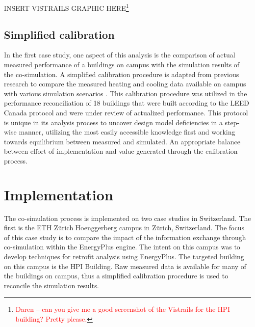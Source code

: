 \documentclass{tBPS2e}
\theoremstyle{plain}
\theoremstyle{definition}
\theoremstyle{remark}
\newcommand{\noteCM}[1]{\footnote{\textcolor{red}{#1}}}
\begin{document}
INSERT VISTRAILS GRAPHIC HERE\noteCM{Daren -- can you give me a good screenshot of the Vistrails for the HPI building? Pretty please.}


\subsection{Simplified calibration}
In the first case study, one aspect of this analysis is the comparison of actual measured performance of a buildings on campus with the simulation results of the co-simulation. A simplified calibration procedure is adapted from previous research to compare the measured heating and cooling data available on campus with various simulation scenarios \citep{Samuelson:2015jg}. This calibration procedure was utilized in the performance reconciliation of 18 buildings that were built according to the LEED Canada protocol and were under review of actualized performance. This protocol is unique in its analysis process to uncover design model deficiencies in a step-wise manner, utilizing the most easily accessible knowledge first and working towards equilibrium between measured and simulated. An appropriate balance between effort of implementation and value generated through the calibration process. 


 
\section{Implementation}\label{Implementation and results}
The co-simulation process is implemented on two case studies in Switzerland. The first is the ETH Z\"urich Hoenggerberg campus in Z\"urich, Switzerland. The focus of this case study is to compare the impact of the information exchange through co-simulation within the EnergyPlus engine. The intent on this campus was to develop techniques for retrofit analysis using EnergyPlus. The targeted building on this campus is the HPI Building. Raw measured data is available for many of the buildings on campus, thus a simplified calibration procedure is used to reconcile the simulation results.\\
\end{document}
